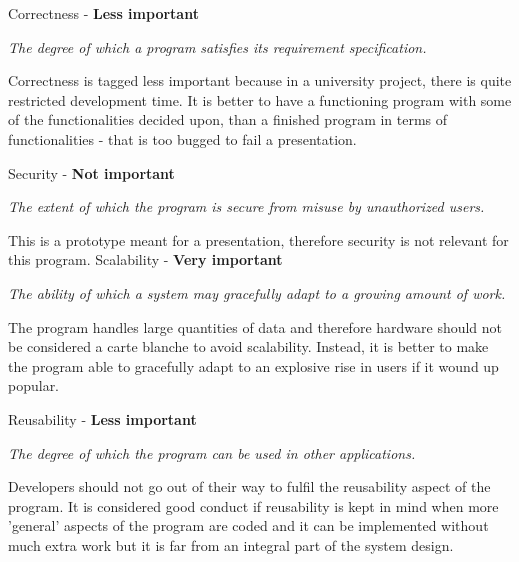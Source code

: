 \vspace{5 mm}
\noindent
Correctness - \textbf{Less important}

\vspace{5 mm}
\noindent
\textit{The degree of which a program satisfies its requirement specification.}

\vspace{5 mm}
\noindent
Correctness is tagged less important because in a university project, there is quite restricted development time. It is better to have a functioning program with some of the functionalities decided upon, than a finished program in terms of functionalities - that is too bugged to fail a presentation.

\vspace{5 mm}
\noindent
Security - \textbf{Not important}

\vspace{5 mm}
\noindent
\textit{The extent of which the program is secure from misuse by unauthorized users.}

\vspace{5 mm}
\noindent
This is a prototype meant for a presentation, therefore security is not relevant for this program.
\newpage
Scalability - \textbf{Very important}

\vspace{5 mm}
\noindent
\textit{The ability of which a system may gracefully adapt to a growing amount of work.}

\vspace{5 mm}
\noindent
The program handles large quantities of data and therefore hardware should not be considered a carte blanche to avoid scalability. Instead, it is better to make the program able to gracefully adapt to an explosive rise in users if it wound up popular.

\vspace{5 mm}
\noindent
Reusability - \textbf{Less important}

\vspace{5 mm}
\noindent
\textit{The degree of which the program can be used in other applications.}

\vspace{5 mm}
\noindent
Developers should not go out of their way to fulfil the reusability aspect of the program. It is considered good conduct if reusability is kept in mind when more 'general' aspects of the program are coded and it can be implemented without much extra work but it is far from an integral part of the system design.

